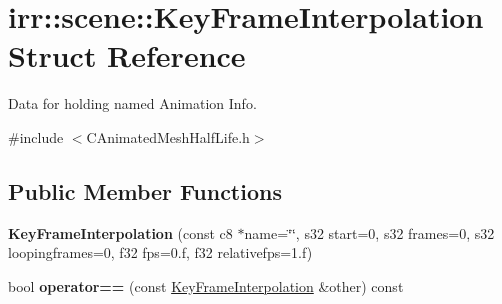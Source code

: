 \hypertarget{structirr_1_1scene_1_1_key_frame_interpolation}{\section{irr\-:\-:scene\-:\-:Key\-Frame\-Interpolation Struct Reference}
\label{structirr_1_1scene_1_1_key_frame_interpolation}
}


Data for holding named Animation Info.  




{\ttfamily \#include $<$C\-Animated\-Mesh\-Half\-Life.\-h$>$}

\subsection*{Public Member Functions}
\begin{DoxyCompactItemize}
\item 
\hypertarget{structirr_1_1scene_1_1_key_frame_interpolation_a1a7e4ac5db4368fa22063134661720d1}{{\bfseries Key\-Frame\-Interpolation} (const c8 $\ast$name=\char`\"{}\char`\"{}, s32 start=0, s32 frames=0, s32 loopingframes=0, f32 fps=0.f, f32 relativefps=1.f)}\label{structirr_1_1scene_1_1_key_frame_interpolation_a1a7e4ac5db4368fa22063134661720d1}

\item 
\hypertarget{structirr_1_1scene_1_1_key_frame_interpolation_a0f1287984cf4efbca33ea7a0ef97f9b8}{bool {\bfseries operator==} (const \hyperlink{structirr_1_1scene_1_1_key_frame_interpolation}{Key\-Frame\-Interpolation} \&other) const }\label{structirr_1_1scene_1_1_key_frame_interpolation_a0f1287984cf4efbca33ea7a0ef97f9b8}

\end{DoxyCompactItemize}
